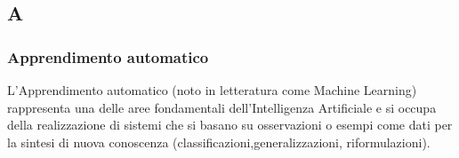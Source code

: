 \subsection*{\textbf{\hfill \Huge{A} \hfill}} 
\subsubsection*{Apprendimento automatico}
L’Apprendimento automatico (noto in letteratura come Machine Learning) rappresenta una delle aree fondamentali dell’Intelligenza Artificiale e si occupa della realizzazione di sistemi che si basano su osservazioni o esempi come dati per la  sintesi di nuova conoscenza (classificazioni,generalizzazioni, riformulazioni).
